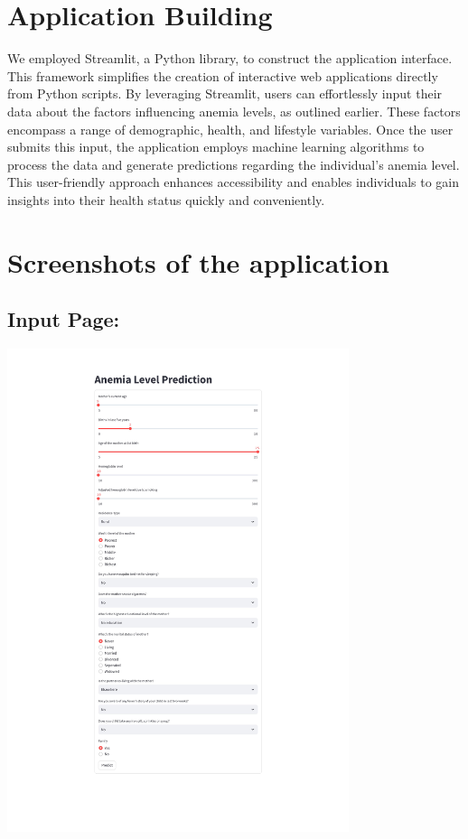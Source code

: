 \section{Application Building}
We employed Streamlit, a Python library, to construct the application interface. This framework simplifies the creation of interactive web applications directly from Python scripts. By leveraging Streamlit, users can effortlessly input their data about the factors influencing anemia levels, as outlined earlier. These factors encompass a range of demographic, health, and lifestyle variables. Once the user submits this input, the application employs machine learning algorithms to process the data and generate predictions regarding the individual's anemia level. This user-friendly approach enhances accessibility and enables individuals to gain insights into their health status quickly and conveniently.


\newpage
\section{Screenshots of the application}

\subsection{Input Page:}
    \includegraphics[width=0.75\textwidth]{input.jpg}

